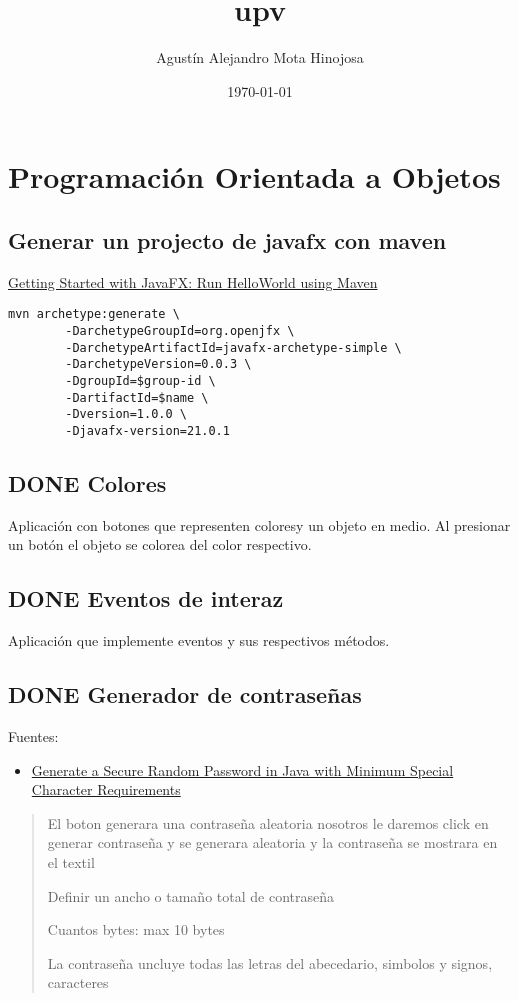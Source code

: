 \documentclass[11pt]{article}
\author{Agustín Alejandro Mota Hinojosa}
\date{\today}
\title{upv}
\begin{document}
\maketitle
\tableofcontents

\section{Programación Orientada a Objetos}
\label{sec:orgba7a88a}

\subsection{Generar un projecto de javafx con maven}
\label{sec:orgf6a5f9d}
\href{https:openjfx.io/openjfx-docs/\#maven}{Getting Started with JavaFX: Run HelloWorld using Maven}

\begin{verbatim}
mvn archetype:generate \
        -DarchetypeGroupId=org.openjfx \
        -DarchetypeArtifactId=javafx-archetype-simple \
        -DarchetypeVersion=0.0.3 \
        -DgroupId=$group-id \
        -DartifactId=$name \
        -Dversion=1.0.0 \
        -Djavafx-version=21.0.1
\end{verbatim}
\subsection{{\bfseries\sffamily DONE} Colores}
\label{sec:org4eaf204}
Aplicación con botones que representen coloresy un objeto en medio. Al
presionar un botón el objeto se colorea del color respectivo.
\subsection{{\bfseries\sffamily DONE} Eventos de interaz}
\label{sec:orgaffaee5}
Aplicación que implemente eventos y sus respectivos métodos.
\subsection{{\bfseries\sffamily DONE} Generador de contraseñas}
\label{sec:org3a3dd28}
Fuentes:
\begin{itemize}
\item \href{https:stackoverflow.com/questions/31260512/generate-a-secure-random-password-in-java-with-minimum-special-character-require}{Generate a Secure Random Password in Java with Minimum Special Character
Requirements}
\end{itemize}
\begin{quote}
El boton generara una contraseña aleatoria
nosotros le daremos click en generar contraseña y se generara aleatoria y
la contraseña se mostrara en el textil

Definir un ancho o tamaño total de contraseña

Cuantos bytes: max 10 bytes

La contraseña uncluye todas las letras del abecedario, simbolos y signos,
caracteres
\end{quote}
\end{document}
